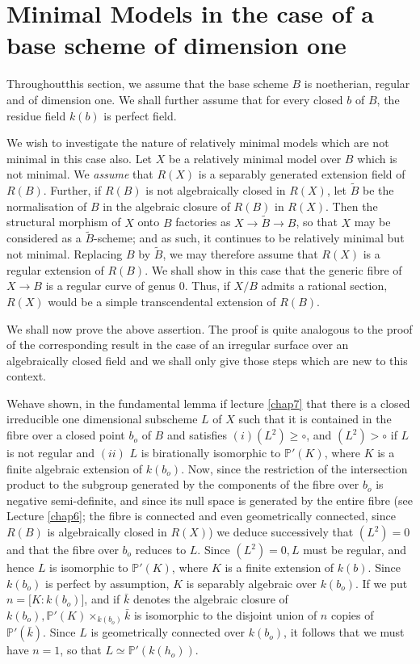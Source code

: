  
\chapter[Minimal Models in the case of a base scheme...]{Minimal Models in the case of a base scheme of
  dimension one}\label{chap8} 

 
Throughout\pageoriginale this section, we assume that the base scheme
$B$ is noetherian, regular and of dimension one. We shall further
assume that for every closed $b$ of $B$, the residue field $k(b)$ is
perfect field.  
  
We wish to investigate the nature of relatively minimal models which
are not minimal in this case also. Let $X$ be a relatively minimal
model over $B$ which is not minimal. We \textit{assume} that $R(X)$ is
a separably generated extension field of $R(B)$. Further, if $R(B)$ is
not algebraically closed in $R(X)$, let $\tilde{B}$ be the
normalisation of $B$ in the algebraic closure of $R(B)$ in
$R(X)$. Then the structural morphism of $X$ onto $B$ factories as
$X\to \tilde{B}\to B$, so that $X$ may be considered as a
$\tilde{B}$-scheme; and as such, it continues to be relatively minimal
but not minimal. Replacing $B$ by $\tilde{B}$, we may therefore assume
that $R(X)$ is a regular extension of $R(B)$. We shall show in this
case that the generic fibre of $X\to B$ is a regular curve of genus
$0$. Thus, if $X/B$ admits a rational section, $R(X)$ would be a simple
transcendental extension of $R(B)$. 
  
We shall now prove the above assertion. The proof is quite analogous
to the proof of the corresponding result in the case of an irregular
surface over an algebraically closed field and we shall only give
those steps which are new to this context.  
 
We\pageoriginale have shown, in the fundamental lemma if lecture
\ref{chap7} that there is a 
closed irreducible one dimensional subscheme $L$ of $X$ such that it
is contained in the fibre over a closed point $b_o$ of $B$ and
satisfies $(i) (L^2)\ge \circ$, and $(L^2)> \circ$ if $L$ is not regular and
$(ii)$ $L$ is birationally isomorphic to $\mathbb{P'}(K)$, where $K$ is
a finite algebraic extension of $k(b_o)$. Now, since the restriction
of the intersection product to the subgroup generated by the
components of the fibre over $b_o$ is negative semi-definite, and
since its null space is generated by the entire fibre (see Lecture \ref{chap6};
the fibre is connected and even geometrically connected, since $R(B)$
is algebraically closed in $R(X)$) we deduce successively that
$(L^2)=0$ and that the fibre over $b_o$ reduces to $L$. Since
$(L^2)=0,L$ must be regular, and hence $L$ is isomorphic to
$\mathbb{P}'(K)$, where $K$ is a finite extension of $k(b)$. Since
$k(b_o)$ is 
perfect by assumption, $K$ is separably algebraic over $k(b_o)$. If we
put $n=\bigg [K:k(b_o) \bigg]$, and if $\bar{k}$ denotes the algebraic
closure of $k(b_o),\mathbb{P'}(K)\times _{k(b_o)}\bar{k}$ is
isomorphic to the disjoint union of $n$ copies of
$\mathbb{P'}(\bar{k})$. Since $L$ is geometrically connected over
$k(b_o)$, it follows that we must have $n=1$, so that $L \simeq
\mathbb{P'}(k(h_o))$. 
 

